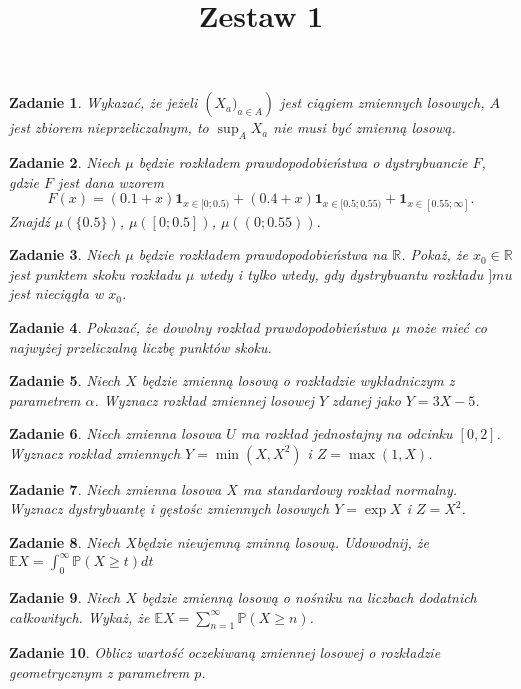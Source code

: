 \documentclass{mwart}
\title{Zestaw 1}
\newtheorem{zd}{Zadanie}
\begin{document}

\maketitle
\begin{zd}
Wykazać, że jeżeli $\left(X_a)_{a\in A}\right)$ jest ciągiem zmiennych losowych, $A$ jest zbiorem nieprzeliczalnym, to $\sup_AX_a$ nie musi być zmienną losową.
\end{zd}

\begin{zd}
Niech $\mu$ będzie rozkładem prawdopodobieństwa o dystrybuancie $F$, gdzie $F$ jest dana wzorem
\begin{displaymath}
F(x) = (0.1+x)\pmb{1}_{x\in[0; 0.5)} + (0.4+x)\pmb{1}_{x\in[0.5; 0.55)} + \pmb{1}_{x\in[0.55; \infty]}.
\end{displaymath}
Znajdź $\mu(\{0.5\})$, $\mu([0; 0.5])$, $\mu((0; 0.55))$.
\end{zd}

\begin{zd}
Niech $\mu$ będzie rozkładem prawdopodobieństwa na $\mathbb{R}$. Pokaż, że $x_0\in \mathbb{R}$ jest punktem skoku rozkładu $\mu$ wtedy i tylko wtedy, gdy dystrybuantu rozkładu $]mu$ jest nieciągła w $x_0$.
\end{zd}

\begin{zd}
Pokazać, że dowolny rozkład prawdopodobieństwa $\mu$ może mieć co najwyżej przeliczalną liczbę punktów skoku.
\end{zd}

\begin{zd}
Niech $X$ będzie zmienną losową o rozkładzie wykładniczym z parametrem $\alpha$. Wyznacz rozkład zmiennej losowej $Y$ zdanej jako $Y=3X-5$.
\end{zd}

\begin{zd}
Niech zmienna losowa $U$ ma rozkład jednostajny na odcinku $[0, 2]$. Wyznacz rozkład zmiennych $Y=\min(X, X^2)$ i $Z=\max(1, X)$.
\end{zd}

\begin{zd}
Niech zmienna losowa $X$ ma standardowy rozkład normalny. Wyznacz dystrybuantę i gęstośc zmiennych losowych $Y=\exp{X}$ i $Z=X^2$.
\end{zd}

\begin{zd}
Niech $X$będzie nieujemną zminną losową. Udowodnij, że $\mathbb{E}X = \int_{0}^{\infty}\mathbb{P}\left(X \geq t\right)dt$
\end{zd}

\begin{zd}
Niech $X$ będzie zmienną losową o nośniku na liczbach dodatnich całkowitych. Wykaż, że $\mathbb{E}X = \sum_{n=1}^{\infty}\mathbb{P}\left(X \geq n\right)$.
\end{zd}

\begin{zd}
Oblicz wartość oczekiwaną zmiennej losowej o rozkładzie geometrycznym z parametrem $p$.
\end{zd}
\end{document}
